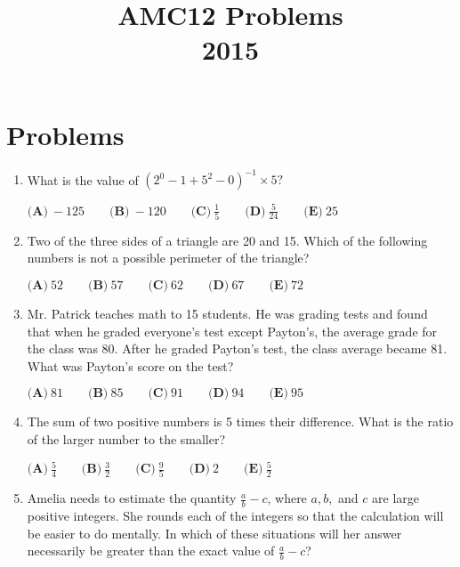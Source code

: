 \documentclass{article}
\title{AMC12 Problems \\ 2015}
\date{}
\begin{document}
\maketitle\thispagestyle{fancy}\newpage\section*{Problems}\begin{enumerate}[label=\arabic*., itemsep=0.5em]\item What is the value of $(2^0-1+5^2-0)^{-1}\times5?$

$ \textbf{(A)}\ -125\qquad\textbf{(B)}\ -120\qquad\textbf{(C)}\ \frac{1}{5}\qquad\textbf{(D)}\ \frac{5}{24}\qquad\textbf{(E)}\ 25 $\par \vspace{0.5em}\item Two of the three sides of a triangle are 20 and 15. Which of the following numbers is not a possible perimeter of the triangle?

$ \textbf{(A)}\ 52\qquad\textbf{(B)}\ 57\qquad\textbf{(C)}\ 62\qquad\textbf{(D)}\ 67\qquad\textbf{(E)}\ 72 $\par \vspace{0.5em}\item Mr. Patrick teaches math to 15 students. He was grading tests and found that when he graded everyone's test except Payton's, the average grade for the class was 80. After he graded Payton's test, the class average became 81. What was Payton's score on the test?

$ \textbf{(A)}\ 81\qquad\textbf{(B)}\ 85\qquad\textbf{(C)}\ 91\qquad\textbf{(D)}\ 94\qquad\textbf{(E)}\ 95 $\par \vspace{0.5em}\item The sum of two positive numbers is 5 times their difference. What is the ratio of the larger number to the smaller?

$ \textbf{(A)}\ \frac54 \qquad\textbf{(B)}\ \frac32 \qquad\textbf{(C)}\ \frac95 \qquad\textbf{(D)}\ 2 \qquad\textbf{(E)}\ \frac52 $\par \vspace{0.5em}\item Amelia needs to estimate the quantity $\frac{a}{b} - c$, where $a, b,$ and $c$ are large positive integers. She rounds each of the integers so that the calculation will be easier to do mentally. In which of these situations will her answer necessarily be greater than the exact value of $\frac{a}{b} - c$?


\end{enumerate}
\end{document}
